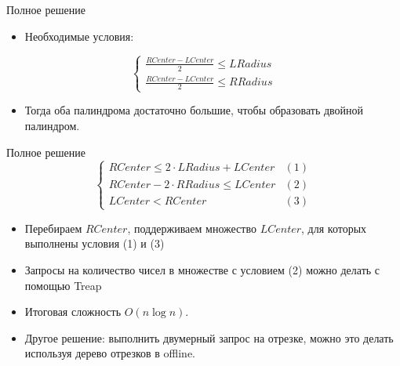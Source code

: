 \begin{frame}{Полное решение}
  \begin{itemize}
  \item Необходимые условия:
  \end{itemize}
  \begin{equation*}
    \begin{cases}
      \frac{RCenter - LCenter}{2} \leq LRadius 
      \\
      \frac{RCenter - LCenter}{2} \leq RRadius
    \end{cases}
  \end{equation*}

  \begin{itemize}
  \item Тогда оба палиндрома достаточно большие, чтобы образовать двойной палиндром.
  \end{itemize}
\end{frame}

\begin{frame}{Полное решение}
  \vspace{-2em}
  \begin{equation*}
    \begin{cases}
      RCenter \leq 2 \cdot LRadius + LCenter & (1)
      \\
      RCenter - 2 \cdot RRadius \leq LCenter  & (2)
      \\
      LCenter < RCenter & (3)
    \end{cases}
  \end{equation*}
  \begin{itemize}
  \item Перебираем $RCenter$, поддерживаем множество $LCenter$, для которых выполнены условия (1) и (3)
  \item Запросы на количество чисел в множестве с условием (2) можно делать с помощью Treap
  \item Итоговая сложность $O(n \log{n})$.
  \item Другое решение: выполнить двумерный запрос на отрезке, можно это делать используя дерево отрезков в offline.
  \end{itemize}
\end{frame}
